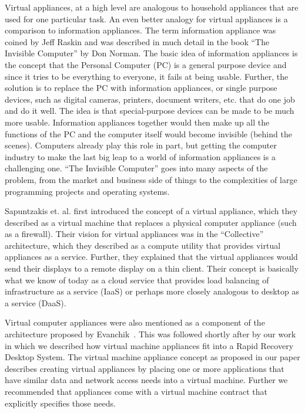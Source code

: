 Virtual appliances, at a high level are analogous to household appliances that are used for one particular task. An even better analogy for virtual appliances is a comparison to information appliances. The term information appliance was coined by Jeff Raskin and was described in much detail in the book ``The Invisible Computer'' by Don Norman\cite{norman_1999}. The basic idea of information appliances is the concept that the Personal Computer (PC) is a general purpose device and since it tries to be everything to everyone, it fails at being usable. Further, the solution is to replace the PC with information appliances, or single purpose devices, such as digital cameras, printers, document writers, etc. that do one job and do it well. The idea is that special-purpose devices can be made to be much more usable. Information appliances together would then make up all the functions of the PC and the computer itself would become invisible (behind the scenes). Computers already play this role in part, but getting the computer industry to make the last big leap to a world of information appliances is a challenging one. ``The Invisible Computer'' goes into many aspects of the problem, from the market and business side of things to the complexities of large programming projects and operating systems.

Sapuntzakis et. al. first introduced the concept of a virtual appliance\cite{sapuntzakis_2003}, which they described as a virtual machine that replaces a physical computer appliance (such as a firewall). Their vision for virtual appliances was in the ``Collective'' architecture, which they described as a compute utility that provides virtual appliances as a service. Further, they explained that the virtual appliances would send their displays to a remote display on a thin client. Their concept is basically what we know of today as a cloud service that provides load balancing of infrastructure as a service (IaaS) or perhaps more closely analogous to desktop as a service (DaaS).

Virtual computer appliances were also mentioned as a component of the architecture proposed by Evanchik~\cite{evanchik_thesis_2004}. This was followed shortly after by our work in which we described how virtual machine appliances fit into a Rapid Recovery Desktop System\cite{rapid_recovery_paper_05}. The virtual machine appliance concept as proposed in our paper describes creating virtual appliances by placing one or more applications that have similar data and network access needs into a virtual machine. Further we recommended that appliances come with a virtual machine contract that explicitly specifies those needs.

